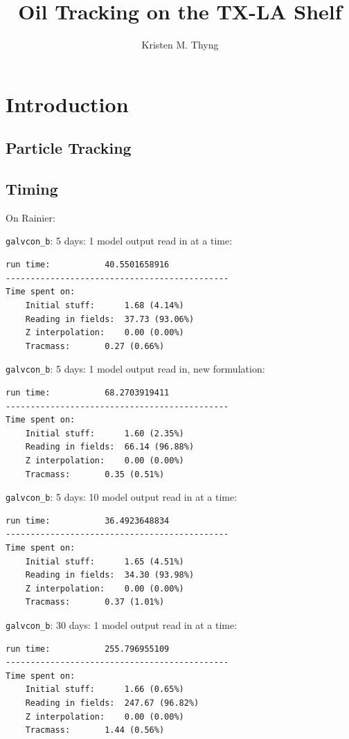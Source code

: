 \documentclass[11pt]{article}
\title{Oil Tracking on the TX-LA Shelf}
\author{Kristen M. Thyng}
\begin{document}
\maketitle

\section{Introduction}

\subsection{Particle Tracking}

\subsection{Timing}

On Rainier:

\verb+galvcon_b+: 5 days: 1 model output read in at a time: \\
\begin{verbatim}
run time:           40.5501658916
---------------------------------------------
Time spent on:
    Initial stuff:      1.68 (4.14%)
    Reading in fields:  37.73 (93.06%)
    Z interpolation:    0.00 (0.00%)
    Tracmass:       0.27 (0.66%)
\end{verbatim}

\verb+galvcon_b+: 5 days: 1 model output read in, new formulation: \\
\begin{verbatim}
run time:           68.2703919411
---------------------------------------------
Time spent on:
    Initial stuff:      1.60 (2.35%)
    Reading in fields:  66.14 (96.88%)
    Z interpolation:    0.00 (0.00%)
    Tracmass:       0.35 (0.51%)
\end{verbatim}

\verb+galvcon_b+: 5 days: 10 model output read in at a time: \\
\begin{verbatim}
run time:           36.4923648834
---------------------------------------------
Time spent on:
    Initial stuff:      1.65 (4.51%)
    Reading in fields:  34.30 (93.98%)
    Z interpolation:    0.00 (0.00%)
    Tracmass:       0.37 (1.01%)
\end{verbatim}

\verb+galvcon_b+: 30 days: 1 model output read in at a time: \\
\begin{verbatim}
run time:           255.796955109
---------------------------------------------
Time spent on:
    Initial stuff:      1.66 (0.65%)
    Reading in fields:  247.67 (96.82%)
    Z interpolation:    0.00 (0.00%)
    Tracmass:       1.44 (0.56%)
\end{verbatim}
\end{document}
